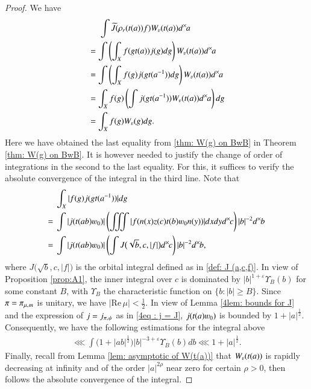 \documentclass{amsproc}
\def\lp {\left (}
\def\rp {\right )}
\renewcommand{\Re}{{\mathrm{Re}\,}}
\def\shskip{\hskip 0.5 pt}
\def\dx{d^{\times} \hskip -1 pt}
\theoremstyle{plain}
\numberwithin{equation}{section}
\begin{document}
\begin{proof} We have
\begin{align*}
& \hskip 13 pt  \int  \widetilde J (\rho_r(t(a)) f)W_{\varv}(t(a))\dx  a \\
&= \int \left(\int_{X}f(gt(a))j (g)dg\right) W_\varv(t(a)) \dx  a \\
&= \int \left( \int_{X}f(g)j (gt(a^{-1}))dg \right)  W_\varv(t(a))\dx  a  \\
&= \int_{X} f(g) \left( \int  j (gt(a^{-1}))W_\varv(t(a))\dx  a \right)dg  \\
&= \int_{X} f(g)W_\varv(g)dg.
\end{align*}
Here we have obtained the last equality from \eqref{thm: W(g) on BwB} in Theorem \ref{thm: W(g) on BwB}. It is however needed to justify the change of order of integrations in the second to the last equality. For this, it suffices to verify the absolute convergence of the integral in the third line. Note that
\begin{align*}
&\int_{X}|f(g)j (gt(a^{-1}))|dg \\
= \ &\int |j (t(ab)\varw_0)|\left(\iiint |f(n(x)z(c)t(b)\varw_0n(y))|dxdy\dx  c \right) |b|^{-2}\dx  b \\
= \ & \int |j (t(ab)\varw_0)| \lp  \int  J \big( \sqrt b,   c, |f| \big)    \dx  c  \rp |b|^{-2} \dx  b,
\end{align*}
where $ J \big( \sqrt b,   c, |f| \big) $ is the orbital integral defined as in \eqref{def: J (a,c,f)}.  In view of Proposition \ref{prop:A1}, the inner integral over $c$ is  dominated by  $  |b|^{1 + \varepsilon} \Upsilon_B (b)$ for some    constant $B$, with $\Upsilon_B$ the characteristic function on $\{ b: |b| \geqslant B \}$. Since $\pi = \pi_{\mu, \shskip  m}$ is unitary, we have   $|\Re \mu | <   \frac 1 2$. In view of  Lemma \ref{4lem: bounds for J} and the expression of $j = j_{\pi, \shskip \psi}$ as in \eqref{4eq : j = J}, $j   (t(a) \varw_0)$ is bounded by $1 +   {|a|}^{\frac 1 2}$. Consequently, we have the following estimations for the integral above
\begin{align*}
\lll \int   \big(  1 +   {|ab|}^{\frac 1 2} \big) |b|^{- 3 + \varepsilon} \Upsilon_B (b) d b \lll 1 + |a|^{\frac 1 2}.
\end{align*}
Finally, recall from Lemma \ref{lem: asymptotic of W(t(a))} that $W_{\varv} (t(a))$ is rapidly decreasing at infinity and of the order $|a|^{2\rho}$ near zero for certain $\rho > 0$, then follows the absolute convergence of the integral.
\end{proof}
\end{document}

